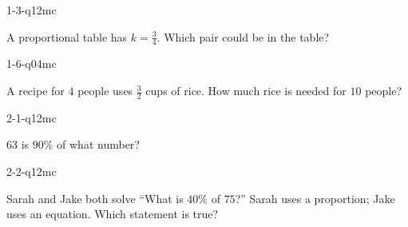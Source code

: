 
\begin{practiceQuestion}{1-3-q12}{mc}
\begin{questionText}
A proportional table has $k = \frac{3}{4}$. Which pair could be in the table?
\end{questionText}
\end{practiceQuestion}

\begin{practiceQuestion}{1-6-q04}{mc}
\begin{questionText}
A recipe for $4$ people uses $\frac{3}{2}$ cups of rice. How much rice is needed for $10$ people?
\end{questionText}
\end{practiceQuestion}

\begin{practiceQuestion}{2-1-q12}{mc}
\begin{questionText}
$63$ is $90\%$ of what number?
\end{questionText}
\end{practiceQuestion}

\begin{practiceQuestion}{2-2-q12}{mc}
\begin{questionText}
Sarah and Jake both solve ``What is $40\%$ of $75$?'' Sarah uses a proportion; Jake uses an equation. Which statement is true?
\end{questionText}
\end{practiceQuestion}

